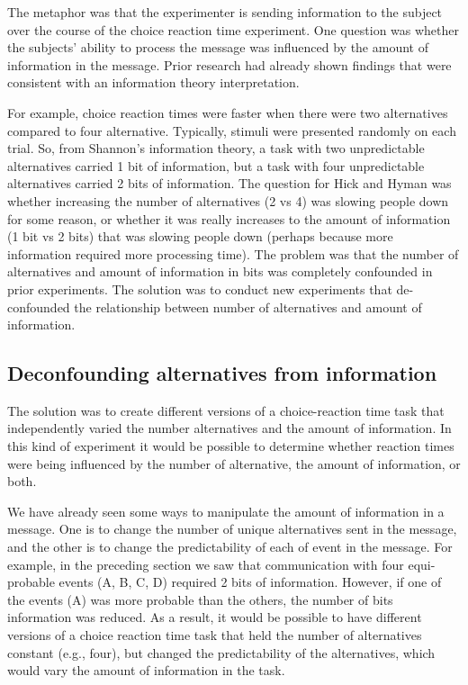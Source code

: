 \documentclass[
  oneside,
  12pt]{crumpbook}
\begin{document}
The metaphor was that the experimenter is sending information to the subject over the course of the choice reaction time experiment. One question was whether the subjects' ability to process the message was influenced by the amount of information in the message. Prior research had already shown findings that were consistent with an information theory interpretation.

For example, choice reaction times were faster when there were two alternatives compared to four alternative. Typically, stimuli were presented randomly on each trial. So, from Shannon's information theory, a task with two unpredictable alternatives carried 1 bit of information, but a task with four unpredictable alternatives carried 2 bits of information. The question for Hick and Hyman was whether increasing the number of alternatives (2 vs 4) was slowing people down for some reason, or whether it was really increases to the amount of information (1 bit vs 2 bits) that was slowing people down (perhaps because more information required more processing time). The problem was that the number of alternatives and amount of information in bits was completely confounded in prior experiments. The solution was to conduct new experiments that de-confounded the relationship between number of alternatives and amount of information.

\hypertarget{deconfounding-alternatives-from-information}{%
\subsection{Deconfounding alternatives from information}\label{deconfounding-alternatives-from-information}}

The solution was to create different versions of a choice-reaction time task that independently varied the number alternatives and the amount of information. In this kind of experiment it would be possible to determine whether reaction times were being influenced by the number of alternative, the amount of information, or both.

We have already seen some ways to manipulate the amount of information in a message. One is to change the number of unique alternatives sent in the message, and the other is to change the predictability of each of event in the message. For example, in the preceding section we saw that communication with four equi-probable events (A, B, C, D) required 2 bits of information. However, if one of the events (A) was more probable than the others, the number of bits information was reduced. As a result, it would be possible to have different versions of a choice reaction time task that held the number of alternatives constant (e.g., four), but changed the predictability of the alternatives, which would vary the amount of information in the task.
\end{document}
